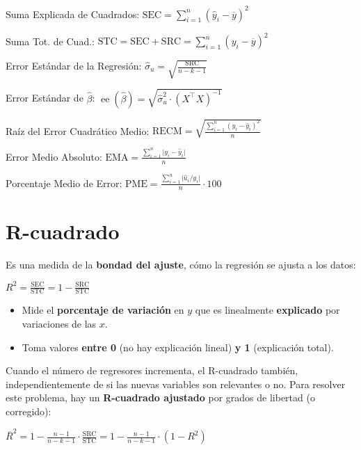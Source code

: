\documentclass[10pt, a4paper, landscape]{article}
\DeclareMathOperator{\se}{ee}
\newcommand{\SSR}{\text{SRC}}
\newcommand{\SSE}{\text{SEC}}
\newcommand{\SST}{\text{STC}}
\begin{document}
\begin{multicols}{3}
Suma Explicada de Cuadrados: \hfill \( \SSE = \sum_{i = 1}^{n} (\hat{y}_{i} - \overline{y})^{2} \)

Suma Tot. de Cuad.: \hfill \( \SST = \SSE + \SSR = \sum_{i = 1}^{n} (y_{i} - \overline{y})^{2} \)

Error Estándar de la Regresión: \hfill \( \hat{\sigma}_{u} = \sqrt{\frac{\SSR}{n - k - 1}} \)

Error Estándar de \( \hat{\beta} \): \hfill \( \se(\hat{\beta}) = \sqrt{\hat{\sigma}_{u}^{2} \cdot (X^{\top} X)^{-1}} \)

Raíz del Error Cuadrático Medio: \hfill \( \text{RECM} = \sqrt{\frac{\sum_{i = 1}^{n} (y_{i} - \hat{y}_{i})^{2}}{n}} \)

Error Medio Absoluto: \hfill \( \text{EMA} = \frac{\sum_{i = 1}^{n} \lvert y_{i} - \hat{y}_{i} \rvert}{n} \)

Porcentaje Medio de Error: \hfill \( \text{PME} = \frac{\sum_{i = 1}^{n} \lvert \hat{u}_{i} / y_{i} \rvert}{n} \cdot 100 \)

\columnbreak

\section*{R-cuadrado}

Es una medida de la \textbf{bondad del ajuste}, cómo la regresión se ajusta a los datos:

\begin{center}
	\( R^{2} = \frac{\SSE}{\SST} = 1 - \frac{\SSR}{\SST} \)
\end{center}

\begin{itemize}[leftmargin=*]
	\item Mide el \textbf{porcentaje de variación} en \( y \) que es linealmente \textbf{explicado} por variaciones de las \( x \).
	\item Toma valores \textbf{entre 0} (no hay explicación lineal) \textbf{y 1} (explicación total).
\end{itemize}

Cuando el número de regresores incrementa, el R-cuadrado también, independientemente de si las nuevas variables son relevantes o no. Para resolver este problema, hay un \textbf{R-cuadrado ajustado} por grados de libertad (o corregido):

\begin{center}
	\( \overline{R}^{2} = 1 - \frac{n - 1}{n - k - 1} \cdot \frac{\SSR}{\SST} = 1 - \frac{n - 1}{n - k - 1} \cdot (1 - R^{2}) \)
\end{center}


\end{multicols}
\end{document}
